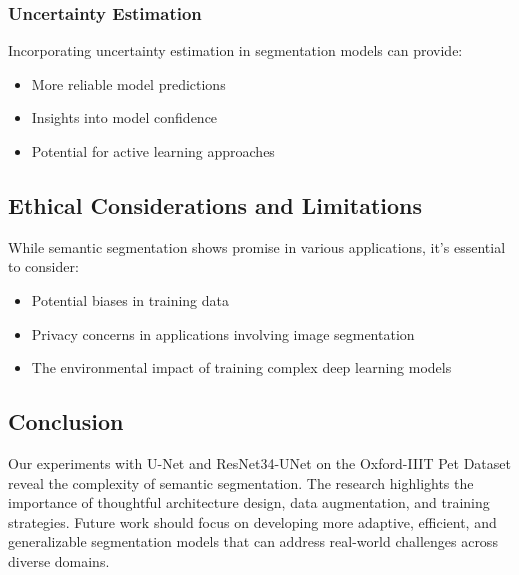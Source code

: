 \documentclass[twocolumn,a4paper]{article}
\begin{document}
\subsubsection{Uncertainty Estimation}
Incorporating uncertainty estimation in segmentation models can provide:
\begin{itemize}
    \item More reliable model predictions
    \item Insights into model confidence
    \item Potential for active learning approaches
\end{itemize}

\subsection{Ethical Considerations and Limitations}
While semantic segmentation shows promise in various applications, it's essential to consider:
\begin{itemize}
    \item Potential biases in training data
    \item Privacy concerns in applications involving image segmentation
    \item The environmental impact of training complex deep learning models
\end{itemize}

\subsection{Conclusion}
Our experiments with U-Net and ResNet34-UNet on the Oxford-IIIT Pet Dataset reveal the complexity of semantic segmentation. The research highlights the importance of thoughtful architecture design, data augmentation, and training strategies. Future work should focus on developing more adaptive, efficient, and generalizable segmentation models that can address real-world challenges across diverse domains.
\end{document}
